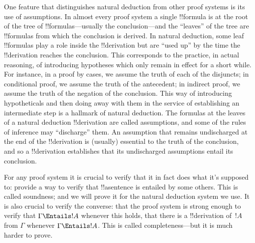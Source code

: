 \documentclass[../../../include/open-logic-section]{subfiles}
\begin{document}
One feature that distinguishes natural deduction from other proof
systems is its use of assumptions. In almost every proof system a
single !!{formula} is at the root of the tree of
!!{formula}s---usually the conclusion---and the ``leaves'' of the tree
are !!{formula}s from which the conclusion is derived.  In natural
deduction, some leaf !!{formula}s play a role inside the
!!{derivation} but are ``used up'' by the time the !!{derivation}
reaches the conclusion. This corresponds to the practice, in actual
reasoning, of introducing hypotheses which only remain in effect for a
short while.  For instance, in a proof by cases, we assume the truth
of each of the disjuncts; in conditional proof, we assume the truth of
the antecedent; in indirect proof, we assume the truth of the negation
of the conclusion.  This way of introducing hypotheticals and then
doing away with them in the service of establishing an intermediate
step is a hallmark of natural deduction. The formulas at the leaves of
a natural deduction !!{derivation} are called assumptions, and some of
the rules of inference may ``discharge'' them.  An assumption that
remains undischarged at the end of the !!{derivation} is (usually)
essential to the truth of the conclusion, and so a !!{derivation}
establishes that its undischarged assumptions entail its conclusion.

For any proof system it is crucial to verify that it in fact does what
it's supposed to: provide a way to verify that !!a{sentence} is
entailed by some others. This is called soundness; and we will prove
it for the natural deduction system we use. It is also crucial to
verify the converse: that the proof system is strong enough to verify
that $\Gamma \Entails !A$ whenever this holds, that there is a
!!{derivation} of~$!A$ from $\Gamma$ whenever $\Gamma \Entails
!A$. This is called completeness---but it is much harder to prove.
\end{document}
